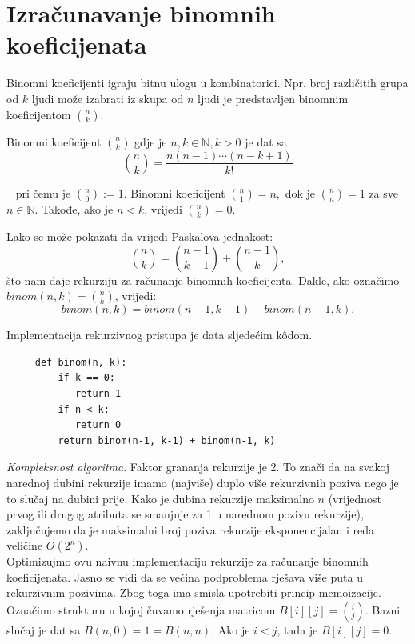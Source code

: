  \section{Izračunavanje binomnih koeficijenata} 
  
  Binomni koeficijenti igraju bitnu ulogu u kombinatorici. Npr. broj različitih grupa od $k$ ljudi može izabrati iz skupa od $n$ ljudi je predstavljen binomnim koeficijentom $\binom{n}{k}$. 
  
  \begin{definition}
  	 Binomni koeficijent $\binom{n}{k}$ gdje je $n, k \in \mathbb{N}, k > 0$  je dat sa 
  	 $$\binom{n}{k} = \frac{n(n-1) \cdots (n-k+1)}{k!}$$
  \end{definition}
  
~ pri čemu je $\binom{n}{0} := 1$. Binomni koeficijent $\binom{n}{1} = n,$ dok je $\binom{n}{n} = 1$ za sve $n \in \mathbb{N}.$ Takođe, ako je $n <k$, vrijedi $\binom{n}{k}=0$.
 
  Lako se može pokazati da vrijedi Paskalova jednakost:
  $$ \binom{n}{k} = \binom{n-1}{k-1} + \binom{n-1}{k},$$
   što nam daje rekurziju za računanje binomnih koeficijenta. Dakle, ako označimo $binom(n, k) = \binom{n}{k}$, vrijedi:
   $$ binom(n, k)= binom(n-1, k-1) + binom(n-1, k).$$
   
   Implementacija rekurzivnog pristupa je data sljedećim k\^odom.
   
   \begin{verbatim}
     def binom(n, k): 
         if k == 0:
            return 1
         if n < k:
            return 0
         return binom(n-1, k-1) + binom(n-1, k)
   \end{verbatim}
  \textit{Kompleksnost algoritma}. Faktor grananja rekurzije je 2. To znači da na svakoj narednoj dubini rekurzije imamo (najviše) duplo više rekurzivnih poziva nego je to slučaj na dubini prije.  Kako je dubina rekurzije maksimalno $n$ (vrijednost prvog ili drugog atributa se smanjuje za 1 u narednom pozivu rekurzije), zaključujemo da je maksimalni broj poziva rekurzije eksponenci\-jalan i reda veličine $O(2^n)$. \\
  
  Optimizujmo ovu naivnu implementaciju rekurzije za računanje binomnih koeficijenata.  Jasno se vidi da se većina podproblema rješava više puta u rekurzivnim pozivima. Zbog toga ima smisla upotrebiti princip memoizacije. Označimo strukturu u kojoj čuvamo rješenja matricom $B[i][j]= \binom{i}{j}$. Bazni slučaj je  dat sa $B(n, 0) = 1 = B(n,n)$. Ako je $i < j$, tada je $B[i][j] = 0$. 
  
